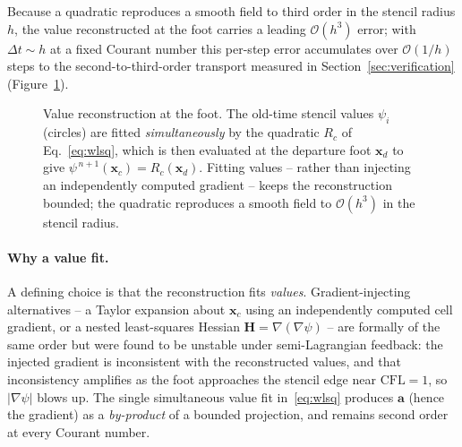 \documentclass[preprint,3p,11pt]{elsarticle}
\newcommand{\psilev}{\psi}                       %
\newcommand{\xd}{\mathbf{x}_d}                    %
\newcommand{\xc}{\mathbf{x}_c}                    %
\newcommand{\gradpsi}{\lvert\nabla\psilev\rvert}
\begin{document}
Because a quadratic reproduces a smooth field to third order in the stencil radius $h$,
the value reconstructed at the foot carries a leading $\mathcal{O}(h^{3})$ error; with
$\Delta t\!\sim\!h$ at a fixed Courant number this per-step error accumulates over
$\mathcal{O}(1/h)$ steps to the second-to-third-order transport measured in
Section~\ref{sec:verification} (Figure~\ref{fig:reconstencil}).

\begin{figure}[t]
  \centering
  \caption{Value reconstruction at the foot. The old-time stencil values $\psilev_i$
  (circles) are fitted \emph{simultaneously} by the quadratic $R_c$ of
  Eq.~\eqref{eq:wlsq}, which is then evaluated at the departure foot $\xd$ to give
  $\psilev^{\,n+1}(\xc)=R_c(\xd)$. Fitting values -- rather than injecting an
  independently computed gradient -- keeps the reconstruction bounded; the quadratic
  reproduces a smooth field to $\mathcal{O}(h^{3})$ in the stencil radius.}
  \label{fig:reconstencil}
\end{figure}

\paragraph{Why a value fit.}
A defining choice is that the reconstruction fits \emph{values}. Gradient-injecting
alternatives -- a Taylor expansion about $\xc$ using an independently computed cell
gradient, or a nested least-squares Hessian $\mathbf{H}=\nabla(\nabla\psilev)$ -- are
formally of the same order but were found to be unstable under semi-Lagrangian
feedback: the injected gradient is inconsistent with the reconstructed values, and
that inconsistency amplifies as the foot approaches the stencil edge near
$\mathrm{CFL}=1$, so $\gradpsi$ blows up. The single simultaneous value fit
in~\eqref{eq:wlsq} produces $\mathbf{a}$ (hence the gradient) as a \emph{by-product}
of a bounded projection, and remains second order at every Courant number.
\end{document}
